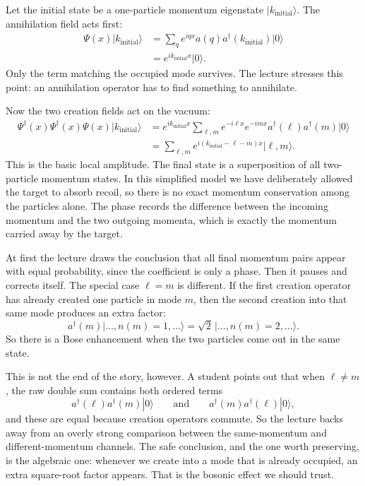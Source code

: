 Let the initial state be a one-particle momentum eigenstate \(|k_{\mathrm{initial}}\rangle\). The annihilation field acts first:
\begin{align}
\Psi(x)|k_{\mathrm{initial}}\rangle
&=
\sum_q e^{iqx}a(q)a^\dagger(k_{\mathrm{initial}})|0\rangle
\\
&=
e^{ik_{\mathrm{initial}}x}|0\rangle.
\end{align}
Only the term matching the occupied mode survives. The lecture stresses this point: an annihilation operator has to find something to annihilate.

Now the two creation fields act on the vacuum:
\begin{align}
\Psi^\dagger(x)\Psi^\dagger(x)\Psi(x)|k_{\mathrm{initial}}\rangle
&=
e^{ik_{\mathrm{initial}}x}
\sum_{\ell,m}
e^{-i\ell x}e^{-imx}
a^\dagger(\ell)a^\dagger(m)|0\rangle
\\
&=
\sum_{\ell,m}
e^{i(k_{\mathrm{initial}}-\ell-m)x}
|\ell,m\rangle.
\end{align}
This is the basic local amplitude. The final state is a superposition of all two-particle momentum states. In this simplified model we have deliberately allowed the target to absorb recoil, so there is no exact momentum conservation among the particles alone. The phase records the difference between the incoming momentum and the two outgoing momenta, which is exactly the momentum carried away by the target.

At first the lecture draws the conclusion that all final momentum pairs appear with equal probability, since the coefficient is only a phase. Then it pauses and corrects itself. The special case \(\ell=m\) is different. If the first creation operator has already created one particle in mode \(m\), then the second creation into that same mode produces an extra factor:
\begin{equation}
a^\dagger(m)\big|\ldots,n(m)=1,\ldots\big\rangle
=
\sqrt{2}\,\big|\ldots,n(m)=2,\ldots\big\rangle.
\end{equation}
So there is a Bose enhancement when the two particles come out in the same state.

This is not the end of the story, however. A student points out that when \(\ell\neq m\), the raw double sum contains both ordered terms
\begin{equation}
a^\dagger(\ell)a^\dagger(m)|0\rangle
\qquad\text{and}\qquad
a^\dagger(m)a^\dagger(\ell)|0\rangle,
\end{equation}
and these are equal because creation operators commute. So the lecture backs away from an overly strong comparison between the same-momentum and different-momentum channels. The safe conclusion, and the one worth preserving, is the algebraic one: whenever we create into a mode that is already occupied, an extra square-root factor appears. That is the bosonic effect we should trust.

